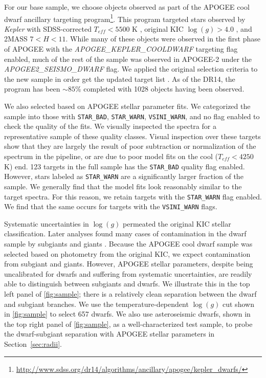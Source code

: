 \documentclass[manuscript]{aastex6}
\newcommand{\Kepler}{\mbox{\textit{Kepler}}}
\newcommand{\Teff}{\ensuremath{T_{eff}}}
\newcommand{\logg}{\ensuremath{\log(g)}}
\newcommand{\STARBAD}{\texttt{STAR\_BAD}}
\newcommand{\STARWARN}{\texttt{STAR\_WARN}}
\newcommand{\VSINIWARN}{\texttt{VSINI\_WARN}}
\newcommand{\gvs}{\authorcomment1}
\begin{document}
For our base sample, we choose objects observed as part of the APOGEE cool
dwarf ancillary targeting
program\footnote{\url{http://www.sdss.org/dr14/algorithms/ancillary/apogee/kepler_dwarfs/}}.
This program targeted stars observed by \Kepler{} with SDSS-corrected
\(\Teff < 5500\) K \citep{Pinsonneault12}, original KIC \(\logg > 4.0\)
\citep{Brown11}, and 2MASS \(7 < H < 11\). While many of these objects
were observed in the first phase of APOGEE with the
\textit{APOGEE\_KEPLER\_COOLDWARF} targeting flag enabled, much of the rest of
the sample was observed in APOGEE-2 under the \textit{APOGEE2\_SEISMO\_DWARF}
flag. We applied the original selection criteria to the new sample in order get
the updated target list \gvs{Use Jen's original list for this?}. As of the DR14, 
the program has been \(\sim 85\)\% completed with 1028 objects having been 
observed. 

We also selected based on APOGEE stellar parameter fits. We categorized the 
sample into those with \STARBAD, \STARWARN,
\VSINIWARN{}, and no flag enabled to check the quality of the fits. We
visually inspected the spectra for a representative sample of these
quality classes. 
Visual inspection over these targets show that they are largely
the result of poor subtraction or normalization of the spectrum in the
pipeline, or are due to poor model fits on the cool (\(\Teff < 4250\) K) end. 123
targets in the full sample has the \STARBAD{} quality flag enabled. 
However, stars labeled as \STARWARN{} are a significantly larger fraction of the 
sample. We generally find that the model fits look reasonably similar to the 
target spectra. For this reason, we retain targets
with the \STARWARN{} flag enabled. We find that the same occurs for targets with 
the \VSINIWARN{} flags.

Systematic uncertainties in \logg{} permeated the original KIC stellar
classification. Later analyses found many cases of contamination in the dwarf 
sample by subgiants 
and giants \citep{Mann12,Gaidos13}. Because the APOGEE cool dwarf sample was 
selected based on photometry from the original KIC, we expect contamination 
from subgiant and giants. However, APOGEE stellar parameters, 
despite being uncalibrated for dwarfs and suffering from 
systematic uncertainties, are readily able to distinguish between subgiants and 
dwarfs. We illustrate this in the top left panel of \cref{fig:sample}; there is a 
relatively clean separation between the dwarf and subgiant branches. We use the
temperature-dependent \logg{} cut shown in \cref{fig:sample} to select 657
dwarfs. We also use asteroseismic dwarfs, shown in the top right panel of
\cref{fig:sample}, as a well-characterized test sample, to probe the 
dwarf-subgiant separation with APOGEE stellar parameters in
Section~\ref{sec:radii}.
\end{document}
